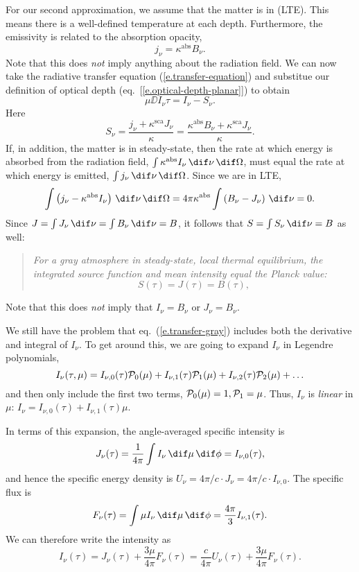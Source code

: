 For our second approximation, we assume that the matter is in  (LTE). This means there is a well-defined temperature at each depth. Furthermore, the emissivity is related to the absorption opacity,
\[
	j_{\nu} = \kappa^{\mathrm{abs}}B_{\nu}.
\]
Note that this does \emph{not} imply anything about the radiation field. We can now take the radiative transfer equation (\ref{e.transfer-equation}) and substitue our definition of optical depth (eq.~[\ref{e.optical-depth-planar}]) to obtain
\begin{equation}\label{e.transfer-gray}
	\mu\DD{I_{\nu}}{\tau} = I_{\nu} - S_{\nu}.
\end{equation}
Here
\[
	S_{\nu} = \frac{j_{\nu} + \kappa^{\mathrm{sca}} J_{\nu}}{\kappa}
	= \frac{\kappa^{\mathrm{abs}} B_{\nu} + \kappa^{\mathrm{sca}} J_{\nu}}{\kappa}.
\]
If, in addition, the matter is in steady-state, then the rate at which energy is absorbed from the radiation field, $\int\kappa^{\mathrm{abs}}I_{\nu}\,\dif\nu\,\dif\Omega$, must equal the rate at which energy is emitted, $\int j_{\nu}\,\dif\nu\,\dif\Omega$. Since we are in LTE,
\[
	\int \left(j_{\nu} - \kappa^{\mathrm{abs}}I_{\nu}\right)\,\dif\nu\,\dif\Omega
	= 4\pi\kappa^{\mathrm{abs}}\int\left(B_{\nu} - J_{\nu}\right)\,\dif\nu = 0.
\]
Since $J = \int J_{\nu}\,\dif\nu = \int B_{\nu}\,\dif\nu = B$, it follows that $S = \int S_{\nu}\,\dif\nu = B$ as well:
\begin{quote}
\emph{For a gray atmosphere in steady-state, local thermal equilibrium, the integrated source function and mean intensity equal the Planck value:}
\[ S(\tau) = J(\tau) = B(\tau), \]
\end{quote}
Note that this does \emph{not} imply that $I_{\nu}=B_{\nu}$ or $J_{\nu}=B_{\nu}$.

We still have the problem that eq.~(\ref{e.transfer-gray}) includes both the derivative and integral of $I_{\nu}$. To get around this, we are going to expand $I_{\nu}$ in Legendre polynomials,
\[
	I_{\nu}(\tau,\mu) = I_{\nu,0}(\tau)\mathcal{P}_{0}(\mu) + I_{\nu,1}(\tau)\mathcal{P}_{1}(\mu) + I_{\nu,2}(\tau)\mathcal{P}_{2}(\mu) + \ldots
\]
and then only include the first two terms, $\mathcal{P}_{0}(\mu) = 1, \mathcal{P}_{1} = \mu$. Thus, $I_{\nu}$ is \emph{linear} in $\mu$: $I_{\nu} = I_{\nu,0}(\tau) + I_{\nu,1}(\tau)\mu$. 

In terms of this expansion, the angle-averaged specific intensity is
\[
	J_{\nu}(\tau) = \frac{1}{4\pi}\int I_{\nu}\,\dif\mu\,\dif\phi = I_{\nu,0}(\tau),
\]
and hence the specific energy density is $U_{\nu} = 4\pi/c\cdot J_{\nu} = 4\pi/c\cdot I_{\nu,0}$. The specific flux is
\[
	F_{\nu}(\tau) = \int \mu I_{\nu}\,\dif\mu\,\dif\phi = \frac{4\pi}{3} I_{\nu,1}(\tau).
\]
We can therefore write the intensity as
\begin{equation}
\label{e.intensity-expanded}
I_{\nu}(\tau) = J_{\nu}(\tau) + \frac{3\mu}{4\pi} F_{\nu}(\tau) = \frac{c}{4\pi}U_{\nu}(\tau) + \frac{3\mu}{4\pi} F_{\nu}(\tau).
\end{equation}

